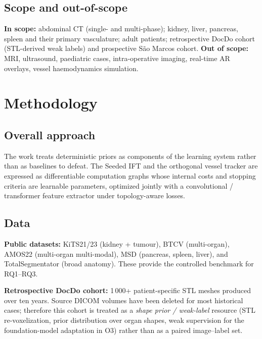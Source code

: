 \documentclass[a4paper,11pt,twoside]{article}
\begin{document}
\subsection{Scope and out-of-scope}

\textbf{In scope:} abdominal CT (single- and multi-phase); kidney, liver,
pancreas, spleen and their primary vasculature; adult patients; retrospective
DocDo cohort (STL-derived weak labels) and prospective S\~ao Marcos cohort.
\textbf{Out of scope:} MRI, ultrasound, paediatric cases, intra-operative
imaging, real-time AR overlays, vessel haemodynamics simulation.

\section{Methodology}

\subsection{Overall approach}

The work treats deterministic priors as components of the learning system
rather than as baselines to defeat. The Seeded IFT and the orthogonal vessel
tracker are expressed as differentiable computation graphs whose internal
costs and stopping criteria are learnable parameters, optimized jointly with
a convolutional / transformer feature extractor under topology-aware losses.

\subsection{Data}

\textbf{Public datasets:} KiTS21/23 (kidney + tumour), BTCV (multi-organ),
AMOS22 (multi-organ multi-modal), MSD (pancreas, spleen, liver), and
TotalSegmentator (broad anatomy). These provide the controlled benchmark for
RQ1--RQ3.

\textbf{Retrospective DocDo cohort:} 1\,000+ patient-specific STL meshes
produced over ten years. Source DICOM volumes have been deleted for most
historical cases; therefore this cohort is treated as a \emph{shape prior /
weak-label} resource (STL re-voxelization, prior distribution over organ
shapes, weak supervision for the foundation-model adaptation in O3) rather
than as a paired image--label set.
\end{document}
